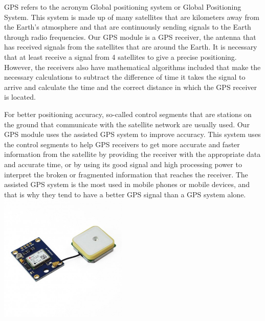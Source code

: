 \documentclass[11pt,a4paper,twocolumn]{article}
\begin{document}
GPS refers to the acronym Global positioning system or Global Positioning System. This system is made up of many satellites that are kilometers away from the Earth's atmosphere and that are continuously sending signals to the Earth through radio frequencies. Our GPS module is a GPS receiver, the antenna that has received signals from the satellites that are around the Earth. It is necessary that at least receive a signal from 4 satellites to give a precise positioning. However, the receivers also have mathematical algorithms included that make the necessary calculations to subtract the difference of time it takes the signal to arrive and calculate the time and the correct distance in which the GPS receiver is located.

For better positioning accuracy, so-called control segments that are stations on the ground that communicate with the satellite network are usually used. Our GPS module uses the assisted GPS system to improve accuracy. This system uses the control segments to help GPS receivers to get more accurate and faster information from the satellite by providing the receiver with the appropriate data and accurate time, or by using its good signal and high processing power to interpret the broken or fragmented information that reaches the receiver. The assisted GPS system is the most used in mobile phones or mobile devices, and that is why they tend to have a better GPS signal than a GPS system alone.
\includegraphics[width=230]{modulo-gps}
\end{document}
